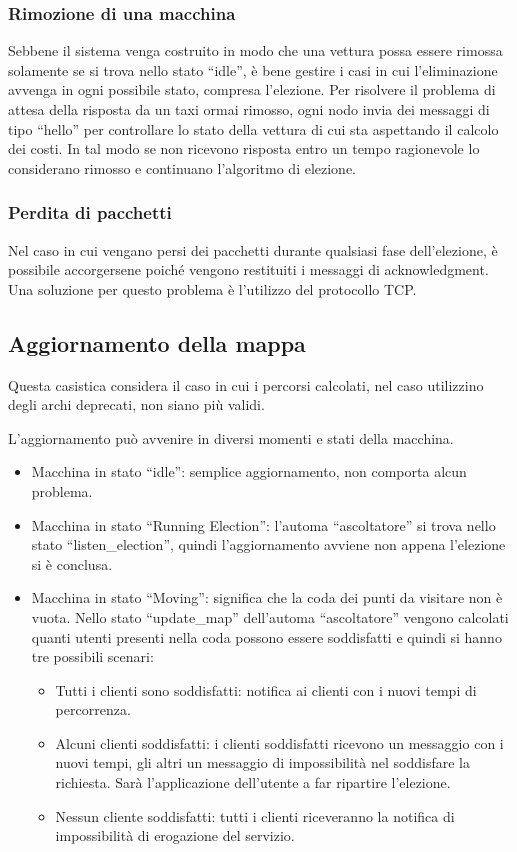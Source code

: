 \subsubsection{Rimozione di una macchina}
Sebbene il sistema venga costruito in modo che una vettura possa essere rimossa solamente se si trova nello stato ``idle'', è bene gestire i casi in cui l'eliminazione avvenga in ogni possibile stato, compresa l'elezione. Per risolvere il problema di attesa della risposta da un taxi ormai rimosso, ogni nodo invia dei messaggi di tipo ``hello'' per controllare lo stato della vettura di cui sta aspettando il calcolo dei costi. In tal modo se non ricevono risposta entro un tempo ragionevole lo considerano rimosso e continuano l'algoritmo di elezione.

\subsubsection{Perdita di pacchetti}
Nel caso in cui vengano persi dei pacchetti durante qualsiasi fase dell'elezione, è possibile accorgersene poiché vengono restituiti i messaggi di acknowledgment. Una soluzione per questo problema è l'utilizzo del protocollo TCP.

\subsection{Aggiornamento della mappa}\label{aggiornamentoMappa}

Questa casistica considera il caso in cui i percorsi calcolati, nel caso utilizzino degli archi deprecati, non siano più validi. 

L'aggiornamento può avvenire in diversi momenti e stati della macchina. 

\begin{itemize}
	\item Macchina in stato ``idle'': semplice aggiornamento, non comporta alcun problema.
	\item Macchina in stato ``Running Election'': l'automa ``ascoltatore'' si trova nello stato ``listen\_election'', quindi l'aggiornamento avviene non appena l'elezione si è conclusa.
	\item Macchina in stato ``Moving'': significa che la coda dei punti da visitare non è vuota. Nello stato ``update\_map'' dell'automa ``ascoltatore'' vengono calcolati quanti utenti presenti nella coda possono essere soddisfatti e quindi si hanno tre possibili scenari:
	\begin{itemize}
		\item Tutti i clienti sono soddisfatti: notifica ai clienti con i nuovi tempi di percorrenza.
		\item Alcuni clienti soddisfatti: i clienti soddisfatti ricevono un messaggio con i nuovi tempi, gli altri un messaggio di impossibilità nel soddisfare la richiesta. Sarà l'applicazione dell'utente a far ripartire l'elezione.
		\item Nessun cliente soddisfatti: tutti i clienti riceveranno la notifica di impossibilità di erogazione del servizio.
	\end{itemize}
\end{itemize}

